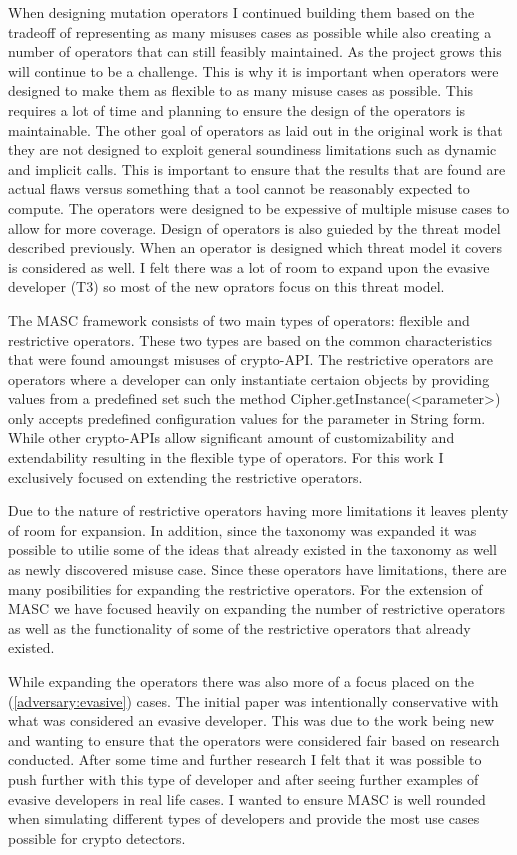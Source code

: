 When designing mutation operators I continued building them based on the tradeoff of representing as many misuses cases as possible while also creating a number of operators that can still feasibly maintained. As the project grows this will continue to be a challenge. This is why it is important when operators were designed to make them as flexible to as many misuse cases as possible. This requires a lot of time and planning to ensure the design of the operators is maintainable. The other goal of operators as laid out in the original work is that they are not designed to exploit general soundiness limitations such as dynamic and implicit calls. This is important to ensure that the results that are found are actual flaws versus something that a tool cannot be reasonably expected to compute. The operators were designed to be expessive of multiple misuse cases to allow for more coverage. Design of operators is also guieded by the threat model described previously. When an operator is designed which threat model it covers is considered as well. I felt there was a lot of room to expand upon the evasive developer (T3) so most of the new oprators focus on this threat model.

The MASC framework consists of two main types of operators: flexible and restrictive operators. These two types are based on the common characteristics that were found amoungst misuses of crypto-API. The restrictive operators are operators where a developer can only instantiate certaion objects by providing values from a predefined set such the method Cipher.getInstance(<parameter>) only accepts predefined configuration values for the parameter in String form. While other crypto-APIs allow significant amount of customizability and extendability resulting in the flexible type of operators. For this work I exclusively focused on extending the restrictive operators.

Due to the nature of restrictive operators having more limitations it leaves plenty of room for expansion. In addition, since the taxonomy was expanded it was possible to utilie some of the ideas that already existed in the taxonomy as well as newly discovered misuse case. Since these operators have limitations, there are many posibilities for expanding the restrictive operators. For the extension of MASC we have focused heavily on expanding the number of restrictive operators as well as the functionality of some of the restrictive operators that already existed.

While expanding the operators there was also more of a focus placed on the (\ref{adversary:evasive}) cases. The initial paper was intentionally conservative with what was considered an evasive developer. This was due to the work being new and wanting to ensure that the operators were considered fair based on research conducted. After some time and further research I felt that it was possible to push further with this type of developer and after seeing further examples of evasive developers in real life cases. I wanted to ensure MASC is well rounded when simulating different types of developers and provide the most use cases possible for crypto detectors.


